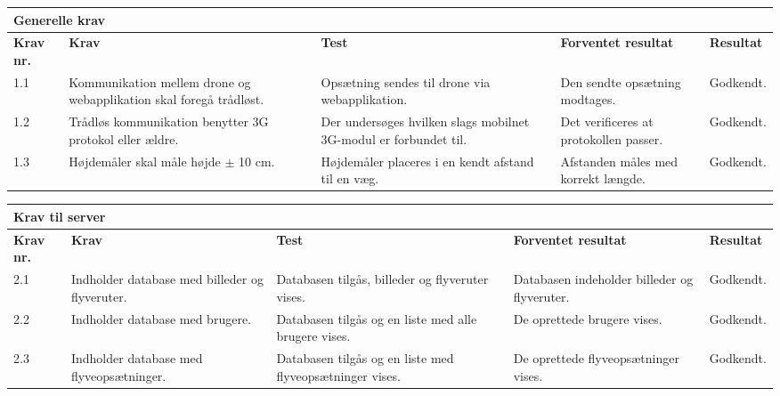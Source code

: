     
    \begin{tabular}{|p{}|p{3.2 cm}|p{3.2 cm}|p{3.2 cm}|p{2.2 cm}|}
			\hline
			\multicolumn{5}{|l|}{\textbf{{\large Generelle krav}}}\\ \hline
			\textbf{Krav nr.} & \textbf{Krav} & \textbf{Test} & \textbf{Forventet \newline resultat} & 			
			\textbf{Resultat} \\ \hline
			
			1.1 & Kommunikation mellem drone og webapplikation skal foregå trådløst.
				& Opsætning sendes til drone via webapplikation.
				& Den sendte opsætning modtages.
				& Godkendt. \\ \hline

			1.2 & Trådløs kommunikation benytter 3G protokol eller ældre. 
				& Der undersøges hvilken slags mobilnet 3G-modul er forbundet til.
				& Det verificeres at protokollen passer.
				& Godkendt. \\ \hline
			
			1.3 & Højdemåler skal måle højde $\pm$ 10 cm.
				& Højdemåler placeres i en kendt afstand til en væg.
				& Afstanden måles med korrekt længde.
				& Godkendt.\\ \hline						
		\end{tabular}

\vspace{2cm}

    
    \begin{tabular}{|p{}|p{3.2 cm}|p{3.2 cm}|p{3.2 cm}|p{2.2 cm}|}
			\hline
			\multicolumn{5}{|l|}{\textbf{{\large Krav til server}}}\\ \hline
			\textbf{Krav nr.} & \textbf{Krav} & \textbf{Test} & \textbf{Forventet \newline resultat} & 			
			\textbf{Resultat} \\ \hline
			
			2.1 & Indholder database med billeder og flyveruter.
				& Databasen tilgås, billeder og flyveruter vises.
				& Databasen indeholder billeder og flyveruter.
				& Godkendt. \\ \hline

			2.2 & Indholder database med brugere.
				& Databasen tilgås og en liste med alle brugere vises.
				& De oprettede brugere vises.
				& Godkendt. \\ \hline		
				
			2.3 & Indholder database med flyveopsætninger.
				& Databasen tilgås og en liste med flyveopsætninger vises.
				& De oprettede flyveopsætninger vises.
				& Godkendt. \\ \hline		
		\end{tabular}

